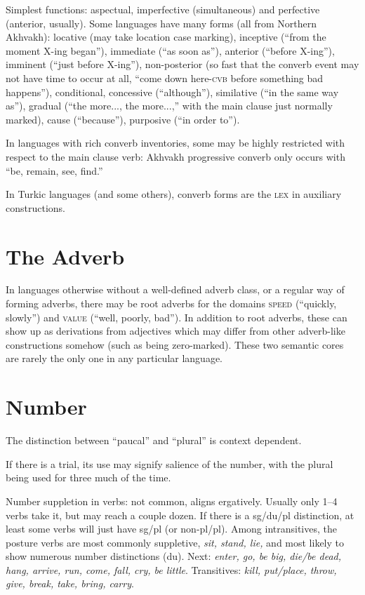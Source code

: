 \documentclass[11pt]{article}
\newcommand{\I}[1]{\textsc{#1}}   %
\begin{document}
Simplest functions: aspectual, imperfective (simultaneous) and
perfective (anterior, usually). Some languages have many forms (all
from Northern Akhvakh): locative (may take location case marking),
inceptive (``from the moment X-ing began''), immediate (``as soon
as''), anterior (``before X-ing''), imminent (``just before X-ing''),
non-posterior (so fast that the converb event may not have time to
occur at all, ``come down here-\I{cvb} before something bad
happens''), conditional, concessive (``although''), similative (``in
the same way as''), gradual (``the more..., the more...,'' with the
main clause just normally marked), cause (``because''), purposive
(``in order to'').

In languages with rich converb inventories, some may be highly
restricted with respect to the main clause verb: Akhvakh progressive
converb only occurs with ``be, remain, see, find.''

In Turkic languages (and some others), converb forms are the \I{lex}
in auxiliary constructions.


\section{The Adverb}
In languages otherwise without a well-defined adverb class, or a
regular way of forming adverbs, there may be root adverbs for the
domains \I{speed} (``quickly, slowly'') and \I{value} (``well,
poorly, bad''). In addition to root adverbs, these can show up as
derivations from adjectives which may differ from other adverb-like
constructions somehow (such as being zero-marked). These two semantic
cores are rarely the only one in any particular language.


\section{Number}
The distinction between ``paucal'' and ``plural'' is context
dependent. 

If there is a trial, its use may signify salience of the number, with
the plural being used for three much of the time.

Number suppletion in verbs: not common, aligns ergatively.  Usually
only 1--4 verbs take it, but may reach a couple dozen.  If there is a
sg/du/pl distinction, at least some verbs will just have sg/pl (or
non-pl/pl).  Among intransitives, the posture verbs are most commonly
suppletive, \textit{sit, stand, lie,} and most likely to show numerous
number distinctions (du).  Next: \textit{enter, go, be big, die/be
  dead, hang, arrive, run, come, fall, cry, be little}.  Transitives:
\textit{kill, put/place, throw, give, break, take, bring, carry}.
\end{document}
